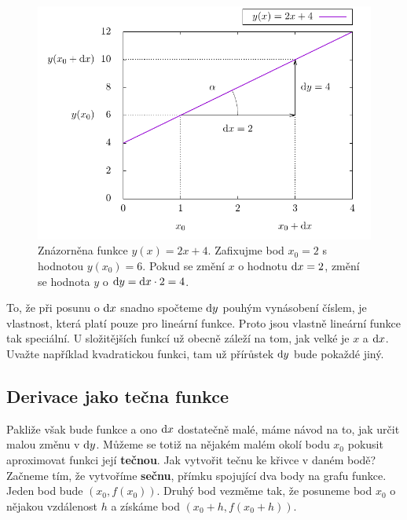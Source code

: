 \begin{figure}[H]
    \centering
    \includegraphics{Gnuplot/cv8/Figures/primka-graf.pdf}
    \caption{Znázorněna funkce $y(x)=2x+4$. Zafixujme bod $x_0=2$ s hodnotou $y(x_0)=6$. Pokud se změní $x$ o hodnotu $\mathrm{d} x = 2$, změní se hodnota $y$ o $\mathrm{d} y = \mathrm{d} x \cdot 2 = 4$.}
\end{figure}

To, že při posunu o $\mathrm{d} x$ snadno spočteme $\mathrm{d} y$ pouhým vynásobení číslem, je vlastnost, která platí pouze pro lineární funkce. Proto jsou vlastně lineární funkce tak speciální. U složitějších funkcí už obecně záleží na tom, jak velké je $x$ a $\mathrm{d} x$. Uvažte například kvadratickou funkci, tam už přírůstek $\mathrm{d} y$ bude pokaždé jiný.

\subsection*{Derivace jako tečna funkce}

Pakliže však bude funkce  a ono $\mathrm{d} x$ dostatečně malé, máme návod na to, jak určit malou změnu v $\mathrm{d} y$. Můžeme se totiž na nějakém malém okolí bodu $x_0$ pokusit aproximovat funkci její \textbf{tečnou}. Jak vytvořit tečnu ke křivce v daném bodě? Začneme tím, že vytvoříme \textbf{sečnu}, přímku spojující dva body na grafu funkce. Jeden bod bude $(x_0,f(x_0))$. Druhý bod vezměme tak, že posuneme bod $x_0$ o nějakou vzdálenost $h$ a získáme bod $(x_0+h,f(x_0+h))$.

